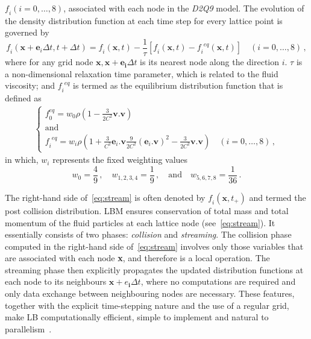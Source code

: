$\mathit{f_i}(\mathit{i}=0,\dots,8)$, associated with each node 
in the \textit{D2Q9} model. The evolution of the density 
distribution function at each time step for every lattice point 
is governed by
%
\begin{equation} 
	\label{eq:stream}
	\mathit{f_i}(\mathbf{x}+\mathbf{e}_{\mathit{i}} \Delta t, t + \Delta t) = 
	\mathit{f_i}(\mathbf{x},t) - \frac{1}{\tau} [\mathit{f_i}(\mathbf{x},t) 
	-\mathit{f_i}^{\mathit{eq}}(\mathbf{x},t)] \quad (\mathit{i}=0,\dots,8) \,,
\end{equation}
%
\noindent where for any grid node 
$\mathbf{x},\mathbf{x}+\mathbf{e_i} \Delta t$ is its nearest 
node along the direction $\mathit{i}$. $\tau$ is a 
non-dimensional relaxation time parameter, which is related to 
the fluid viscosity; and $\mathit{f_i}^{\mathit{eq}}$ is termed 
as the equilibrium distribution function that is defined as
%
\begin{align}
	\begin{cases}
	\mathit{f}_{\mathit{0}}^{\mathit{eq}} = \mathit{w}_{\mathit{0}} \rho (1 - 
	\frac{3}{2\mathit{C}^{\mathit{2}}}\mathbf{v}.\mathbf{v}) \\ 
	\mbox{and}\\
	\mathit{f_i}^{\mathit{eq}} = \mathit{w_i} \rho (1 + 
	\frac{3}{\mathit{C}^{\mathit{2}}}\mathbf{e}_{\mathit{i}}.\mathbf{v} 
	\frac{9}{2\mathit{C}^{\mathit{2}}} 
	(\mathbf{e}_{\mathit{i}}.\mathbf{v})^{\mathit{2}}-\frac{3}{2 
	\mathit{C}^{\mathit{2}}}\mathbf{v}.\mathbf{v}) \quad 
	(\mathit{i}=0,\dots,8)\,,
	\end{cases}
\end{align}
%
\noindent in which, $\mathit{w_i}$ represents the fixed weighting values
%
\begin{equation}
	\mathit{w}_{\mathit{0}} = \frac{4}{9}\,, \quad 
	\mathit{w}_{\mathit{1,2,3,4}}= 
	\frac{1}{9}\,, \quad \mbox{and} \quad \mathit{w}_{\mathit{5,6,7,8}}= 
	\frac{1}{36}\,.
\end{equation}

The right-hand side of~\cref{eq:stream} is often denoted by 
$\mathit{f_i}(\mathbf{x}, \mathit{t}_{+})$ and termed the post 
collision distribution. LBM ensures conservation of total 
mass and total momentum of the fluid particles at each lattice 
node (see~\cref{eq:stream}). It essentially consists of two 
phases: 
\textit{collision} and \textit{streaming}. The collision phase 
computed in the right-hand side of~\cref{eq:stream}
involves only those variables that are associated with each 
node \textbf{x}, and therefore is a local operation. The 
streaming phase then explicitly propagates the updated 
distribution functions at each node to its neighbours 
$\mathbf{x}+\mathbf{\mathit{e}_i} \Delta t$, where no 
computations are required and only data exchange between 
neighbouring nodes are necessary. These features, together with 
the explicit time-stepping nature and the use of a regular 
grid, make LB computationally efficient, simple to implement 
and natural to parallelism~\citep{Han2007a}. 

